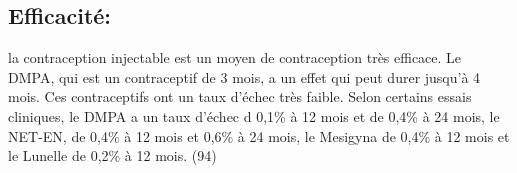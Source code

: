 \subsection{Efficacité: }

la contraception injectable est un moyen de contraception très efficace. Le DMPA, qui est un contraceptif de 3 mois, a un effet qui peut durer jusqu’à 4 mois. Ces contraceptifs ont un taux d’échec très faible. Selon certains essais cliniques, le DMPA a un taux d’échec d 0,1\% à 12 mois et de 0,4\% à 24 mois, le NET-EN, de 0,4\% à 12 mois et 0,6\% à 24 mois, le Mesigyna de 0,4\% à 12 mois et le Lunelle de 0,2\% à 12 mois. (94) 

\pagebreak


